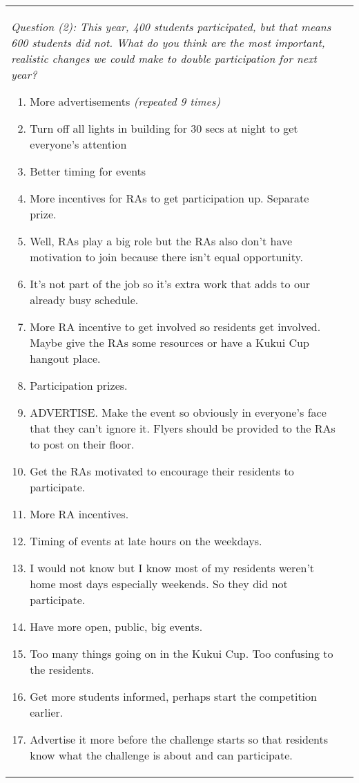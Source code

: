 \documentclass[]{IEEEconf}
\begin{document}
\begin{figure*}[th!]
\begin{tabular}{|l|l|}
\hline

\small  \begin{minipage}[t]{3.5in}
{\em Question (2): This year, 400 students participated, but that means 600 students did not.  What do you think are the 
most important, realistic changes we could make to double participation for next year? }
\begin{enumerate}
\item More advertisements {\em (repeated 9 times)}
\item Turn off all lights in building for 30 secs at night to get everyone's attention
\item Better timing for events
\item More incentives for RAs to get participation up.  Separate prize.
\item Well, RAs play a big role but the RAs also don't have motivation to join because there isn't equal opportunity. 
\item It's not part of the job so it's extra work that adds to our already busy schedule.
\item More RA incentive to get involved so residents get involved.   Maybe give the RAs some resources or have a Kukui Cup hangout place. 
\item Participation prizes.
\item ADVERTISE.  Make the event so obviously in everyone's face that they can't ignore
  it. Flyers should be  provided to the RAs to post on their floor.
\item Get the RAs motivated to encourage their residents to participate.
\item More RA incentives. 
\item Timing of events at late hours on the weekdays.
\item I would not know but I know most of my residents weren't home most days especially weekends.  So they did not participate.
\item Have more open, public, big events.
\item Too many things going on in the Kukui Cup.   Too confusing to the residents. 
\item Get more students informed, perhaps start the competition earlier.
\item Advertise it more before the challenge starts so that residents know what the challenge is about and can participate.

\end{enumerate}
\end{minipage}
\end{tabular}
\end{figure*}
\end{document}
